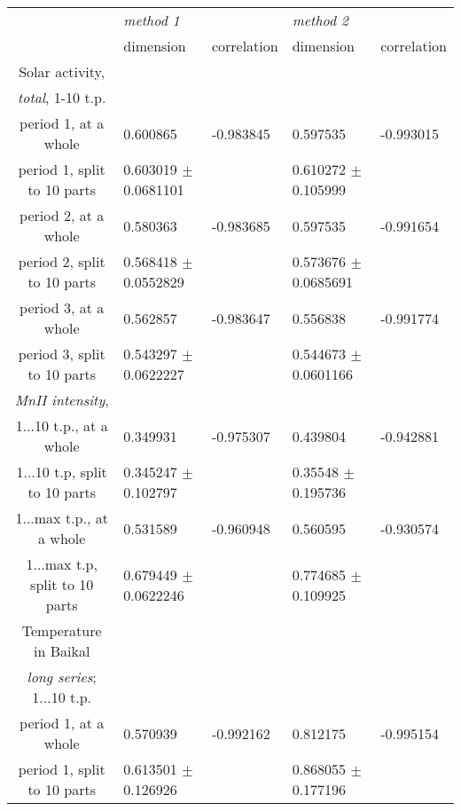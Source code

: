 \documentclass[a4paper]{article}
\begin{document}
\small{

\begin{tabular}{cllll}
\hline
                               & \textit{method 1}        &             & \textit{method 2}        &             \\
                               & dimension                & correlation & dimension                & correlation \\
\hline 
Solar activity,\\
\textit{total}, 1-10 t.p.\\
period 1, at a whole           & 0.600865                 & -0.983845   & 0.597535                 & -0.993015   \\
period 1, split to 10 parts    & 0.603019 $\pm$ 0.0681101 &             & 0.610272 $\pm$ 0.105999  &             \\
period 2, at a whole           & 0.580363                 & -0.983685   & 0.597535                 & -0.991654   \\
period 2, split to 10 parts    & 0.568418 $\pm$ 0.0552829 &             & 0.573676 $\pm$ 0.0685691 &             \\
period 3, at a whole           & 0.562857                 & -0.983647   & 0.556838                 & -0.991774   \\
period 3, split to 10 parts    & 0.543297 $\pm$ 0.0622227 &             & 0.544673 $\pm$ 0.0601166 &             \\
\textit{MnII intensity},\\
1...10 t.p., at a whole        & 0.349931                 & -0.975307   & 0.439804                 & -0.942881   \\
1...10 t.p, split to 10 parts  & 0.345247 $\pm$ 0.102797  &             & 0.35548 $\pm$ 0.195736   &             \\
1...max t.p., at a whole       & 0.531589                 & -0.960948   & 0.560595                 & -0.930574   \\
1...max t.p, split to 10 parts & 0.679449 $\pm$ 0.0622246 &             & 0.774685 $\pm$ 0.109925  &             \\
\hline
Temperature in Baikal\\
\textit{long series}; 1...10 t.p.\\
period 1, at a whole           & 0.570939                 & -0.992162   & 0.812175                 & -0.995154   \\
period 1, split to 10 parts    & 0.613501 $\pm$ 0.126926  &             & 0.868055 $\pm$ 0.177196  &             \\

\end{tabular}}
\end{document}
